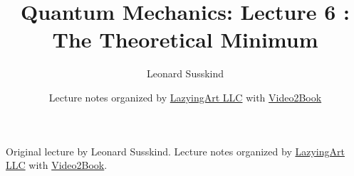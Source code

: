 \documentclass[11pt,oneside]{book}
\begin{document}
\frontmatter
\title{Quantum Mechanics: Lecture 6 : The Theoretical Minimum}
\author{Leonard Susskind}
\date{Lecture notes organized by \href{https://lazying.art}{LazyingArt LLC} with \href{https://github.com/lachlanchen/Video2Book}{Video2Book}}
\maketitle
\begin{center}
\small Original lecture by Leonard Susskind. Lecture notes organized by \href{https://lazying.art}{LazyingArt LLC} with \href{https://github.com/lachlanchen/Video2Book}{Video2Book}.
\end{center}
\clearpage
\mainmatter

\end{document}
